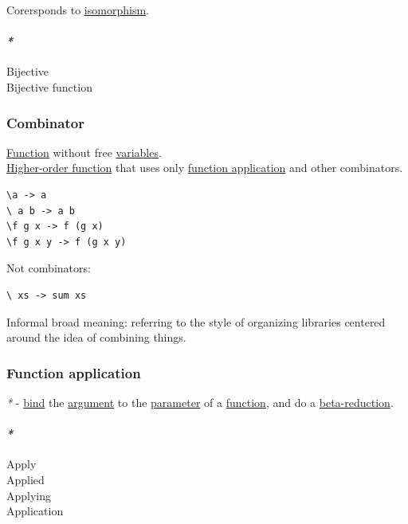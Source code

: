 \documentclass[11pt]{article}
\begin{document}
Corersponds to \hyperref[org91df03a]{isomorphism}.\\

\paragraph{\emph{*}}
\label{sec:orgd0bb9a4}

\label{org13a0cd3}Bijective\\
\label{orgb12b677}Bijective function\\

\subsubsection{\label{orgf51e837}Combinator}
\label{sec:orgf55eb55}
\hyperref[orge15bc14]{Function} without free \hyperref[orge17f54f]{variables}.\\
\hyperref[org4d1d0e3]{Higher-order function} that uses only \hyperref[org6aac242]{function application} and other combinators.\\

\begin{verbatim}
\a -> a
\ a b -> a b
\f g x -> f (g x)
\f g x y -> f (g x y)
\end{verbatim}

Not combinators:\\
\begin{verbatim}
\ xs -> sum xs
\end{verbatim}
Informal broad meaning: referring to the style of organizing libraries centered around the idea of combining things.\\

\subsubsection{\label{org6aac242}Function application}
\label{sec:org85ca6f4}
\emph{*} - \hyperref[org07cdf3f]{bind} the \hyperref[orga6b7e97]{argument} to the \hyperref[org0e7674e]{parameter} of a \hyperref[orge15bc14]{function}, and do a \hyperref[orgeb925c3]{beta-reduction}.\\

\paragraph{\emph{*}}
\label{sec:org9ce67ad}

\label{org644adf5}Apply\\
\label{org7abd585}Applied\\
\label{org6b37c0b}Applying\\
\label{org2b89e66}Application\\
\end{document}
